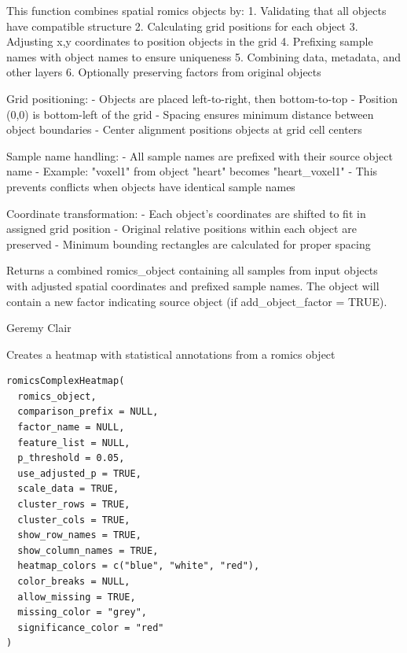 \documentclass[a4paper]{book}
\begin{document}
%
\begin{Details}
This function combines spatial romics objects by:
1. Validating that all objects have compatible structure
2. Calculating grid positions for each object
3. Adjusting x,y coordinates to position objects in the grid
4. Prefixing sample names with object names to ensure uniqueness
5. Combining data, metadata, and other layers
6. Optionally preserving factors from original objects

Grid positioning:
- Objects are placed left-to-right, then bottom-to-top
- Position (0,0) is bottom-left of the grid
- Spacing ensures minimum distance between object boundaries
- Center alignment positions objects at grid cell centers

Sample name handling:
- All sample names are prefixed with their source object name
- Example: "voxel1" from object "heart" becomes "heart\_voxel1"
- This prevents conflicts when objects have identical sample names

Coordinate transformation:
- Each object's coordinates are shifted to fit in assigned grid position
- Original relative positions within each object are preserved
- Minimum bounding rectangles are calculated for proper spacing
\end{Details}
%
\begin{Value}
Returns a combined romics\_object containing all samples from input objects
with adjusted spatial coordinates and prefixed sample names. The object will contain
a new factor indicating source object (if add\_object\_factor = TRUE).
\end{Value}
%
\begin{Author}
Geremy Clair
\end{Author}
%
\begin{Description}
Creates a heatmap with statistical annotations from a romics object
\end{Description}
%
\begin{Usage}
\begin{verbatim}
romicsComplexHeatmap(
  romics_object,
  comparison_prefix = NULL,
  factor_name = NULL,
  feature_list = NULL,
  p_threshold = 0.05,
  use_adjusted_p = TRUE,
  scale_data = TRUE,
  cluster_rows = TRUE,
  cluster_cols = TRUE,
  show_row_names = TRUE,
  show_column_names = TRUE,
  heatmap_colors = c("blue", "white", "red"),
  color_breaks = NULL,
  allow_missing = TRUE,
  missing_color = "grey",
  significance_color = "red"
)
\end{verbatim}
\end{Usage}
\end{document}
